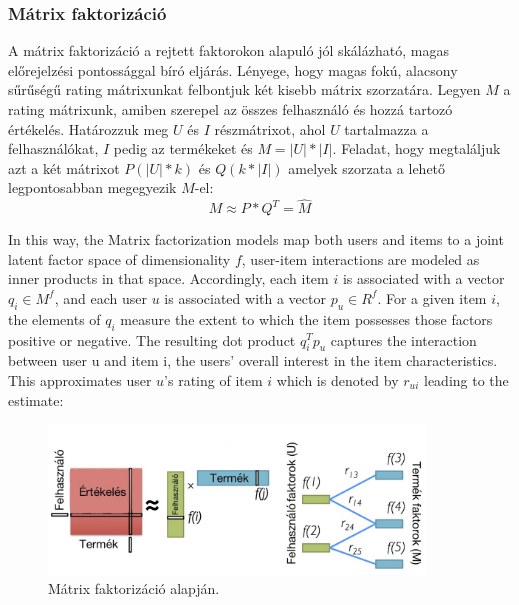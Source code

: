 \documentclass[a4paper,12pt]{article}
\begin{document}
\subsubsection{Mátrix faktorizáció}
A mátrix faktorizáció a rejtett faktorokon alapuló jól skálázható, magas előrejelzési pontossággal bíró eljárás. Lényege, hogy magas fokú, alacsony sűrűségű rating mátrixunkat felbontjuk két kisebb mátrix szorzatára. Legyen $M$ a rating mátrixunk, amiben szerepel az összes felhasználó és hozzá tartozó értékelés. Határozzuk meg $U$ és $I$ részmátrixot, ahol $U$ tartalmazza a felhasználókat, $I$ pedig az termékeket és $M=|U| * |I|$. Feladat, hogy megtaláljuk azt a két mátrixot $P(|U| * k)$ és $Q(k * |I|)$ amelyek szorzata a lehető legpontosabban megegyezik $M$-el:
\[M \approx P * Q^T = \hat{M}\]

In this way, the Matrix factorization models map both users and items to a joint latent factor space of dimensionality $f$, user-item interactions are modeled as inner products in that space. Accordingly, each item $i$ is associated with a vector $q_{i} \in M^f$, and each user $u$ is associated with a vector $p_{u} \in R^f$. For a given item $i$, the elements of $q_{i}$ measure the extent to which the item possesses those factors positive or negative. The resulting dot product $q_{i}^Tp_{u}$ captures the interaction between user u and item i, the users’ overall interest in the item characteristics. This approximates user $u$’s rating of item $i$ which is denoted by $r_{ui}$ leading to the estimate:


\begin{figure}[ht!]
\centering
\includegraphics[width=100mm]{img/matrix_factorization.jpg}
\caption{Mátrix faktorizáció \cite{mf_databricks} alapján.}
\end{figure}
\end{document}
